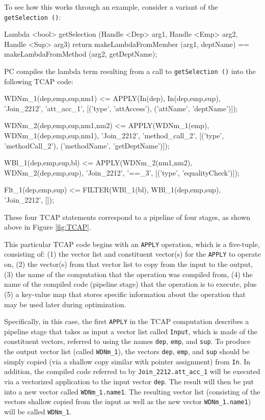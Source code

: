 To see how this works through an example, consider a variant of the \texttt{getSelection ()}:

\begin{codesmall} 
Lambda <bool> getSelection (Handle <Dep> arg1, 
     Handle <Emp> arg2, Handle <Sup> arg3) {
	return makeLambdaFromMember (arg1, deptName) == 
	       makeLambdaFromMethod (arg2, getDeptName);  }
\end{codesmall}

\noindent PC compiles the lambda term resulting from a call to \texttt{getSelection ()} into the following TCAP code:

\begin{codesmall}
WDNm_1(dep,emp,sup,nm1) <= APPLY(In(dep), 
   In(dep,emp,sup), 'Join_2212', 'att_acc_1', 
      [('type', 'attAccess'), ('attName', 'deptName')]);

WDNm_2(dep,emp,sup,nm1,nm2) <= APPLY(WDNm_1(emp), 
   WDNm_1(dep,emp,sup,nm1), 'Join_2212',
      'method_call_2', [('type', 'methodCall_2'), 
          ('methodName', 'getDeptName')]);

WBl_1(dep,emp,sup,bl) <= APPLY(WDNm_2(nm1,nm2),
   WDNm_2(dep,emp,sup), 'Join_2212', '==_3', 
      [('type', 'equalityCheck')]);

Flt_1(dep,emp,sup) <= FILTER(WBl_1(bl), 
   WBl_1(dep,emp,sup), 'Join_2212', []);
\end{codesmall}

\noindent
These four TCAP statements correspond to a pipeline of four stages,
as shown above in Figure \ref{fig:TCAP}.

This particular TCAP code begins with an \texttt{APPLY} operation, which is a five-tuple, consisting of: (1) the vector list and constituent
vector(s) for the \texttt{APPLY} to operate on, (2) the vector(s) from that vector list to copy
from the input to the output, (3) the name of the computation that the operation was compiled from, (4) the name of the compiled code (pipeline stage)
that the operation is to execute, plus (5) a key-value map that stores specific information about the operation that may be used 
later during optimization.

Specifically, in this case, the first \texttt{APPLY} in the TCAP computation describes a pipeline stage that
takes as input 
a vector list called \texttt{Input}, which is made of the constituent vectors, referred to using 
the names \texttt{dep}, \texttt{emp}, and \texttt{sup}.
To produce the output vector list (called \texttt{WDNm\_1}), the vectors
\texttt{dep}, \texttt{emp}, and \texttt{sup} should be simply copied
(via a shallow copy similar with pointer assignment) from \texttt{In}.
In addition, the compiled code referred to by \texttt{Join\_2212.att\_acc\_1} will be executed via a vectorized application to the input
vector \texttt{dep}.  The result will then be put into a new vector called 
\texttt{WDNm\_1.name1}.
The resulting vector list (consisting of the vectors shallow copied from the input as well as the new vector \texttt{WDNm\_1.name1})
will be called \texttt{WDNm\_1}.  

